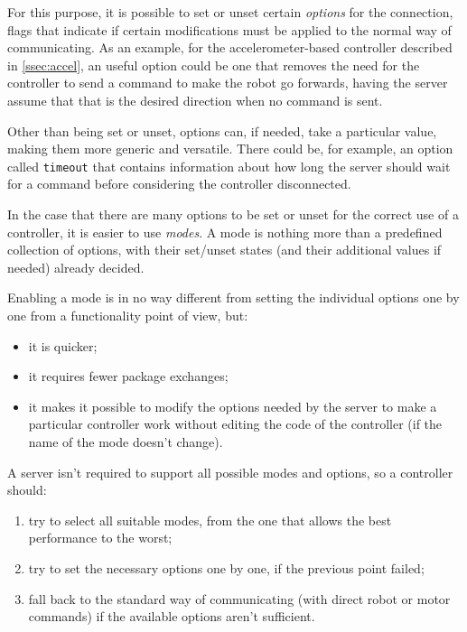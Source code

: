   For this purpose, it is possible to set or unset certain
  \textit{options} for the connection, flags that indicate if
  certain modifications must be applied to the normal way of
  communicating. As an example, for the accelerometer-based
  controller described in \autoref{ssec:accel}, an useful option could
  be one that removes the need for the controller to send a command
  to make the robot go forwards, having the server assume that that
  is the desired direction when no command is sent.

  Other than being set or unset, options can, if needed, take a
  particular value, making them more generic and versatile. There
  could be, for example, an option called \texttt{timeout} that
  contains information about how long the server should wait for a
  command before considering the controller disconnected.

  In the case that there are many options to be set or unset for the
  correct use of a controller, it is easier to use \textit{modes}. A
  mode is nothing more than a predefined collection of options, with
  their set/unset states (and their additional values if needed)
  already decided.

  \beforelist* Enabling a mode is in no way different from setting the individual
  options one by one from a functionality point of view, but:
  \begin{itemize}
  \item it is quicker;
  \item it requires fewer package exchanges;
  \item it makes it possible to modify the options needed by the
    server to make a particular controller work without editing the
    code of the controller (if the name of the mode doesn't change).
  \end{itemize}
  \afterlist*
  \beforelist* A server isn't required to support all possible modes and options,
  so a controller should:
  \begin{enumerate}
  \item try to select all suitable modes, from the one that allows
    the best performance to the worst;
  \item try to set the necessary options one by one, if the previous
    point failed;
  \item fall back to the standard way of communicating (with direct
    robot or motor commands) if the available options aren't
    sufficient.
  \end{enumerate}
  \afterlist*
